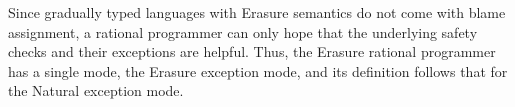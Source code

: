 

Since gradually typed languages with Erasure semantics do not come
with blame assignment, a rational programmer can only hope that the
underlying safety checks and their exceptions are helpful.  Thus, the
Erasure rational programmer has a single mode, the Erasure exception
mode, and its definition follows that for the Natural exception mode.
